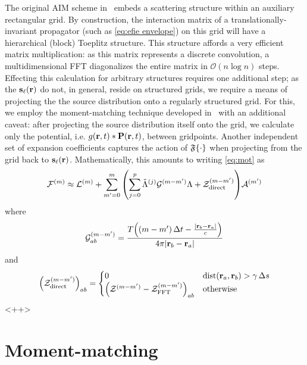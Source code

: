 The original AIM scheme in~\cite{Bleszynski1996} embeds a scattering structure within an auxiliary rectangular grid.
By construction, the interaction matrix of a translationally-invariant propagator (such as \cref{eq:efie envelope}) on this grid will have a hierarchical (block) Toeplitz structure.
This structure affords a very efficient matrix multiplication: as this matrix represents a discrete convolution, a multidimensional FFT diagonalizes the entire matrix in $\mathcal{O}(n \log n)$ steps.
Effecting this calculation for arbitrary structures requires one additional step; as the $\vb{s}_\ell(\vb{r})$ do not, in general, reside on structured grids, we require a means of projecting the the source distribution onto a regularly structured grid.
For this, we employ the moment-matching technique developed in~\cite{Bleszynski1996} with an additional caveat: after projecting the source distribution itself onto the grid, we calculate only the potential, i.e. $g(\vb{r}, t) \ast \vb{P}(\vb{r}, t)$, between gridpoints.
Another independent set of expansion coefficients captures the action of $\mathfrak{F}\qty{\cdot}$ when projecting from the grid back to $\vb{s}_\ell(\vb{r})$. 
Mathematically, this amounts to writing \cref{eq:mot} as 
\begin{equation}
  \mathcal{F}^{(m)} \approx \mathcal{L}^{(m)} + \sum_{m'= 0}^m \qty(\sum_{j=0}^p \tilde{\Lambda}^{(j)}\mathcal{G}^{(m - m')} \Lambda + \mathcal{Z}^{(m - m')}_\text{direct})\mathcal{A}^{(m')}
\end{equation}
where 
\begin{equation}
  \mathcal{G}^{(m - m')}_{ab} = \frac{T\qty((m - m')\, \Delta t - \frac{\abs{\vb{r}_b - \vb{r}_a}}{c})}{4 \pi \abs{\vb{r}_b - \vb{r}_a}}
  \label{<+label+>}
\end{equation}
and
\begin{equation}
  \qty(\mathcal{Z}^{(m - m')}_\text{direct})_{ab} = \begin{cases}
    0                                                                   & \text{dist}(\vb{r}_a, \vb{r}_b) > \gamma \, \Delta s \\
    \qty(\mathcal{Z}^{(m-m')} - \mathcal{Z}^{(m - m')}_\text{FFT})_{ab} & \text{otherwise}
  \end{cases}
  \label{<+label+>}
\end{equation}<++>

\section{Moment-matching}

